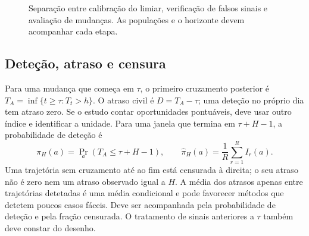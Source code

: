 \begin{figure}[htbp]
\centering
{}
\caption{Separação entre calibração do limiar, verificação de falsos sinais e avaliação de mudanças. As populações e o horizonte devem acompanhar cada etapa.}
\label{fig:mat-calibracao-simulacao}
\end{figure}

\subsection{Deteção, atraso e censura}
\label{sec:mat-deteccao}
Para uma mudança que começa em $\tau$, o primeiro cruzamento posterior é $T_A=\inf\{t\geq\tau:T_t>h\}$. O atraso civil é $D=T_A-\tau$; uma deteção no próprio dia tem atraso zero. Se o estudo contar oportunidades pontuáveis, deve usar outro índice e identificar a unidade. Para uma janela que termina em $\tau+H-1$, a probabilidade de deteção é
\begin{equation}
\pi_H(a)=\Pr_a(T_A\leq\tau+H-1),
\qquad \widehat\pi_H(a)=\frac1R\sum_{r=1}^{R}I_r(a).
\label{eq:mat-deteccao}
\end{equation}
Uma trajetória sem cruzamento até ao fim está censurada à direita; o seu atraso não é zero nem um atraso observado igual a $H$. A média dos atrasos apenas entre trajetórias detetadas é uma média condicional e pode favorecer métodos que detetem poucos casos fáceis. Deve ser acompanhada pela probabilidade de deteção e pela fração censurada. O tratamento de sinais anteriores a $\tau$ também deve constar do desenho.

